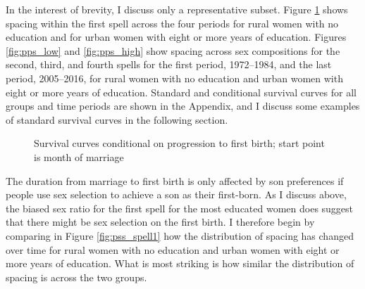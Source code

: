 \documentclass[12pt,letterpaper]{article}
\begin{document}
In the interest of brevity, I discuss only a representative subset.
Figure \ref{fig:pps_spell1} shows spacing within the first spell across the
four periods for rural women with no education and for urban women with 
eight or more years of education.
Figures \ref{fig:pps_low} and \ref{fig:pps_high} show spacing across sex
compositions for the second, third, and fourth spells for the first period, 
1972--1984, and the last period, 2005--2016, for rural women with no 
education and urban women with eight or more years of education.
Standard and conditional survival curves for all groups and time periods 
are shown in the Appendix, and I discuss some examples of standard survival
curves in the following section.


\begin{figure}[htpb]
\centering
\setcounter{subfigure}{-1}
\setcounter{subfigure}{0}
\caption{
Survival curves conditional on progression to first birth; start point is month of marriage
}
\label{fig:pps_spell1}
\end{figure}

The duration from marriage to first birth is only affected by son preferences if
people use sex selection to achieve a son as their first-born.
As I discuss above, the biased sex ratio for the first spell for the most educated 
women does suggest that there might be sex selection on the first birth.
I therefore begin by comparing in Figure \ref{fig:pss_spell1} how the distribution 
of spacing has changed over time for rural women with no education and urban women 
with eight or more years of education.
What is most striking is how similar the distribution of spacing is across the
two groups.
\end{document}
